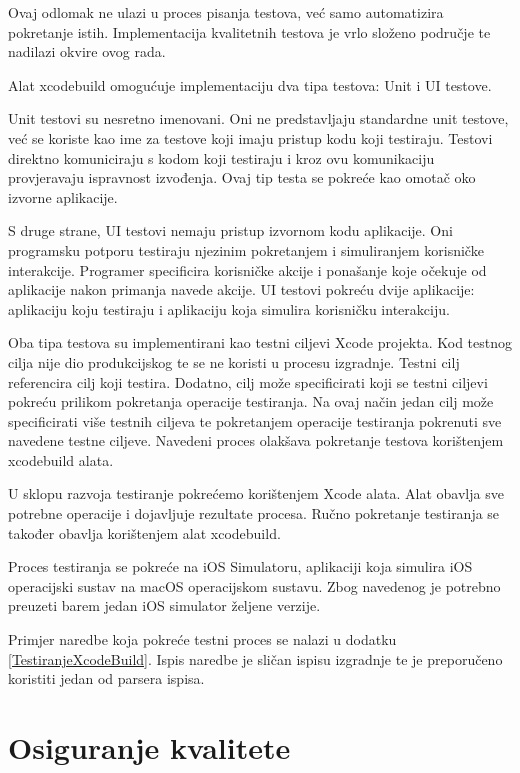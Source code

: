 \documentclass[times, utf8, diplomski, numeric]{fer}
\begin{document}
Ovaj odlomak ne ulazi u proces pisanja testova, već samo automatizira pokretanje istih. Implementacija kvalitetnih testova je vrlo složeno područje te nadilazi okvire ovog rada.

Alat xcodebuild omogućuje implementaciju dva tipa testova: Unit i UI testove.

Unit testovi su nesretno imenovani. Oni ne predstavljaju standardne unit testove, već se koriste kao ime za testove koji imaju pristup kodu koji testiraju. Testovi direktno komuniciraju s kodom koji testiraju i kroz ovu komunikaciju provjeravaju ispravnost izvođenja. Ovaj tip testa se pokreće kao omotač oko izvorne aplikacije.

S druge strane, UI testovi nemaju pristup izvornom kodu aplikacije. Oni programsku potporu testiraju njezinim pokretanjem i simuliranjem korisničke interakcije. Programer specificira korisničke akcije i ponašanje koje očekuje od aplikacije nakon primanja navede akcije. UI testovi pokreću dvije aplikacije: aplikaciju koju testiraju i aplikaciju koja simulira korisničku interakciju.

Oba tipa testova su implementirani kao testni ciljevi Xcode projekta. Kod testnog cilja nije dio produkcijskog te se ne koristi u procesu izgradnje. Testni cilj referencira cilj koji testira. Dodatno, cilj može specificirati koji se testni ciljevi pokreću prilikom pokretanja operacije testiranja. Na ovaj način jedan cilj može specificirati više testnih ciljeva te pokretanjem operacije testiranja pokrenuti sve navedene testne ciljeve. Navedeni proces olakšava pokretanje testova korištenjem xcodebuild alata.

U sklopu razvoja testiranje pokrećemo korištenjem Xcode alata. Alat obavlja sve potrebne operacije i dojavljuje rezultate procesa. Ručno pokretanje testiranja se također obavlja korištenjem alat xcodebuild.

Proces testiranja se pokreće na iOS Simulatoru, aplikaciji koja simulira iOS operacijski sustav na macOS operacijskom sustavu. Zbog navedenog je potrebno preuzeti barem jedan iOS simulator željene verzije.

Primjer naredbe koja pokreće testni proces se nalazi u dodatku \ref{TestiranjeXcodeBuild}. Ispis naredbe je sličan ispisu izgradnje te je preporučeno koristiti jedan od parsera ispisa.


\section{Osiguranje kvalitete}
\end{document}
